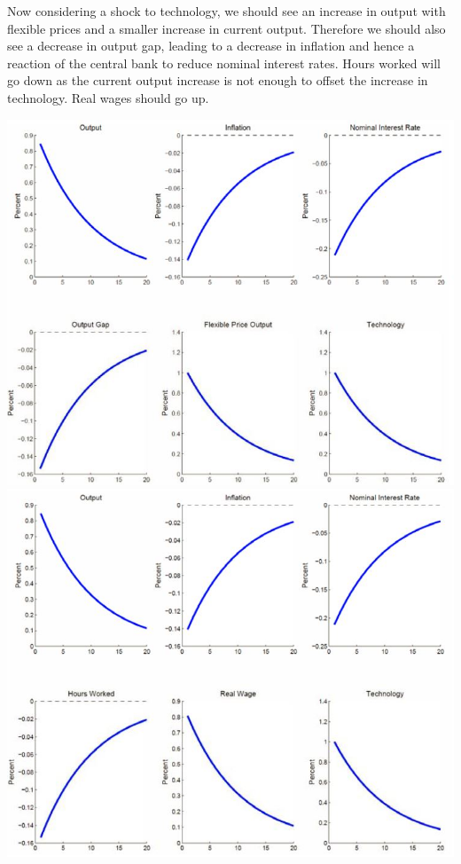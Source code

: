 \documentclass[12pt]{report}
\begin{document}
Now considering a shock to technology, we should see an increase in output with flexible prices and a smaller increase in current output. Therefore we should also see a decrease in output gap, leading to a decrease in inflation and hence a reaction of the central bank to reduce nominal interest rates. Hours worked will go down as the current output increase is not enough to offset the increase in technology. Real wages should go up.\begin{center}
\includegraphics[scale=0.5]{images/techshock3DNK1}
\includegraphics[scale=0.5]{images/techshock3DNK2}
\end{center}
\end{document}
